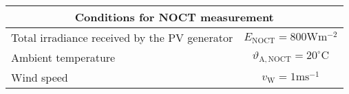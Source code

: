 \footnotesize
\begin{tabular}{|l|c|}
	\hline
	\multicolumn{2}{|c|}{\textbf{Conditions for NOCT measurement}} \\
	\hline
 	Total irradiance received by the PV generator & $E_{\mathrm{NOCT}} = 800\mathrm{W} \mathrm{m}^{-2}$ \\
	Ambient temperature & $\vartheta_{\mathrm{A, NOCT}} = 20^\circ \mathrm{C}$ \\
	Wind speed & $v_{\mathrm W} = 1 \mathrm{m} \mathrm{s}^{-1}$  \\
	\hline
\end{tabular}